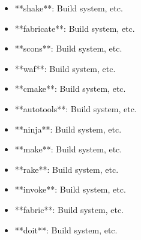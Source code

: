 \documentclass[11pt,a4paper]{article}
\begin{document}
\begin{itemize}
\item **shake**: Build system, etc.
\end{itemize}

\begin{itemize}
\item **fabricate**: Build system, etc.
\end{itemize}

\begin{itemize}
\item **scons**: Build system, etc.
\end{itemize}

\begin{itemize}
\item **waf**: Build system, etc.
\end{itemize}

\begin{itemize}
\item **cmake**: Build system, etc.
\end{itemize}

\begin{itemize}
\item **autotools**: Build system, etc.
\end{itemize}

\begin{itemize}
\item **ninja**: Build system, etc.
\end{itemize}

\begin{itemize}
\item **make**: Build system, etc.
\end{itemize}

\begin{itemize}
\item **rake**: Build system, etc.
\end{itemize}

\begin{itemize}
\item **invoke**: Build system, etc.
\end{itemize}

\begin{itemize}
\item **fabric**: Build system, etc.
\end{itemize}

\begin{itemize}
\item **doit**: Build system, etc.
\end{itemize}
\end{document}
